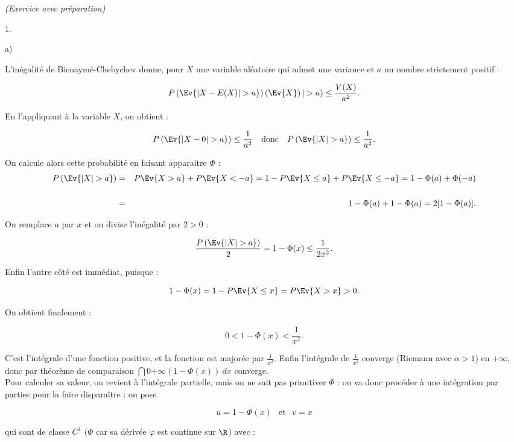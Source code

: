 \documentclass[11pt]{article}%
\begin{document}
\begin{exercice}{\it (Exercice avec préparation)}
\begin{noliste}{1.}
\begin{noliste}{a)}
 \item L'inégalité de Bienaymé-Chebychev donne, pour $X$ une variable
aléatoire qui admet une variance et $a$ un nombre strictement positif :

 
\[
 P \left(\Ev{ | X - E ( X ) | > a }\right)\left(\Ev{ X }\right) | > a )
\leq \frac{ V ( X ) }{ a^{2} }. 
\]

 En l'appliquant à la variable $X$, on obtient : 
 
\[
 P \left(\Ev{ | X - 0 | > a }\right) \leq \frac{ 1 }{ a^{2} } \ \
\text{ donc } \ \ P \left(\Ev{ | X | > a }\right) \leq \frac{ 1 }{
a^{2} }. 
\]

 On calcule alors cette probabilité en faisant apparaitre $\Phi$ : 
 \begin{eqnarray*}
 P \left(\Ev{ | X | > a }\right) & = & P \Ev{ X > a } + P \Ev{ X < - a
} = 1 - P \Ev{ X \leq a } + P \Ev{ X \leq - a } = 1 - \Phi ( a) + \Phi
( - a ) \\
\\
 & = & 1 - \Phi ( a ) + 1 - \Phi ( a ) = 2 [ 1 - \Phi ( a) ]. \end{eqnarray*}

 On remplace $a$ par $x$ et on divise l'inégalité par $2 > 0$ : 
 
\[
 \frac{ P \left(\Ev{ | X | > a }\right) }{ 2 } = 1 - \Phi ( x) \leq
\frac{ 1 }{ 2 x^{2} }. 
\]

 Enfin l'autre côté est immédiat, puisque : 
 
\[
 1 - \Phi ( x) = 1 - P \Ev{ X \leq x } = P \Ev{ X > x } > 0. 
\]

 On obtient finalement : 
 
\[
 0 < 1 - \Phi (x) < \frac{ 1 }{ x^{2} }. 
\]

 \item C'est l'intégrale d'une fonction positive, et la fonction est
majorée par $\frac{1}{x^{2}}$. Enfin l'intégrale de $\frac{1}{x^{2}}$
converge (Riemann avec $\alpha > 1$) en $ + \infty$, donc par théorème
de comparaison $\dint{0}{+ \infty} (1 - \Phi (x) ) \ dx$ converge. \\

 Pour calculer sa valeur, on revient à l'intégrale partielle, mais on
ne sait pas primitiver $\Phi$ : on va donc procéder à une intégration
par parties pour la faire disparaître : on pose
 
\[
 u = 1 - \Phi (x) \ \ \text{ et } \ \ v = x 
\]

 qui sont de classe $C^{1}$ ($\Phi$ car sa dérivée $\varphi$ est
continue sur $\R$) avec : 
 

\end{noliste}
\end{noliste}
\end{exercice}
\end{document}
